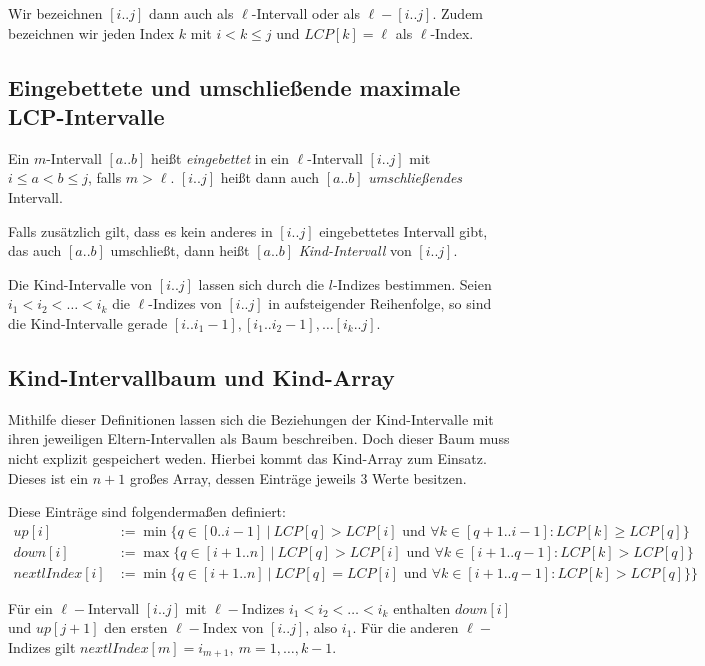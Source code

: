 Wir bezeichnen $[i..j]$ dann auch als $\ell$-Intervall oder als $\ell-[i..j]$. Zudem bezeichnen wir jeden Index $k$ mit $i < k \leq j$ und $LCP[k] = \ell$ als $\ell$-Index.

\subsection{Eingebettete und umschließende maximale LCP-Intervalle}
\label{embeddedlcpintervals}

Ein $m$-Intervall $[a..b]$ heißt \textit{eingebettet} in ein $\ell$-Intervall $[i..j]$ mit $i \leq a < b \leq j$, falls $m > \ell$. $[i..j]$ heißt dann auch $[a..b]$ \textit{umschließendes} Intervall.

Falls zusätzlich gilt, dass es kein anderes in $[i..j]$ eingebettetes Intervall gibt, das auch $[a..b]$ umschließt, dann heißt $[a..b]$ \textit{Kind-Intervall} von $[i..j]$.

Die Kind-Intervalle von $[i..j]$ lassen sich durch die $l$-Indizes bestimmen. Seien $i_1 < i_2 < \dots < i_k$ die $\ell$-Indizes von $[i..j]$ in aufsteigender Reihenfolge, so sind die 
Kind-Intervalle gerade $[i.. i_1 - 1], [i_1.. i_2 - 1], \dots [i_k..j]$.

\subsection{Kind-Intervallbaum und Kind-Array}

Mithilfe dieser Definitionen lassen sich die Beziehungen der Kind-Intervalle mit ihren jeweiligen Eltern-Intervallen als Baum beschreiben.
Doch dieser Baum muss nicht explizit gespeichert weden. Hierbei kommt das Kind-Array zum Einsatz. Dieses ist ein $n + 1$ großes Array, dessen Einträge jeweils 3 Werte besitzen.

Diese Einträge sind folgendermaßen definiert:
\begin{align*}
	up[i] &:= \min\{q \in [0..i-1] \ |\ LCP[q] > LCP[i] \text{ und } \forall k \in [q + 1..i - 1] : LCP[k] \geq LCP[q]\}\\
	down[i] &:= \max\{q \in [i+1..n] \ |\ LCP[q] > LCP[i] \text{ und } \forall k \in [i + 1 .. q - 1] : LCP[k] > LCP[q]\}\\
	nextlIndex[i] &:= \min\{q \in [i+1..n] \ |\ LCP[q] = LCP[i] \text{ und } \forall k \in [i + 1 .. q - 1] : LCP[k] > LCP[q]\}\}
\end{align*}

Für ein $\ell-$Intervall $[i..j]$ mit $\ell-$Indizes $i_1 < i_2 < \dots < i_k$ enthalten $down[i]$ und $up[j+1]$ den ersten $\ell-$Index von $[i..j]$, also $i_1$. Für die anderen $\ell-$Indizes gilt $nextlIndex[m] = i_{m+1},\ m=1,\dots,k-1$.


